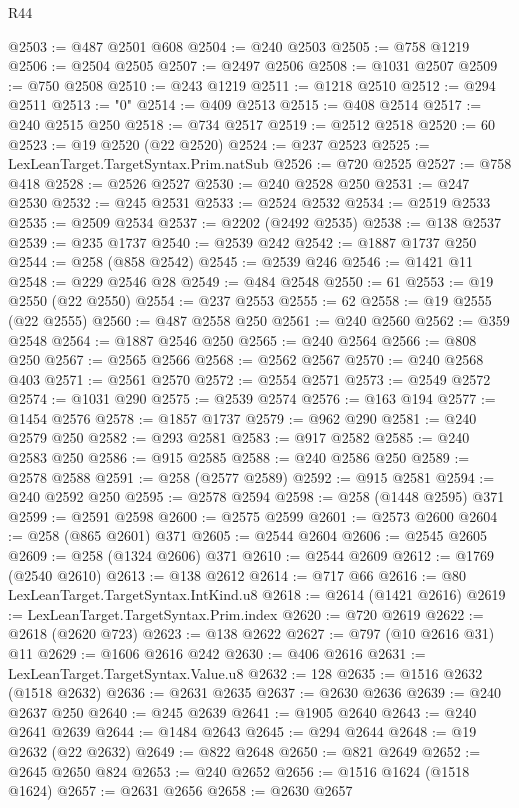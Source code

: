 \begin{lexlean}{R44}
\begin{coremodule}
{@2503 := @487 @2501 @608
@2504 := @240 @2503
@2505 := @758 @1219
@2506 := @2504 @2505
@2507 := @2497 @2506
@2508 := @1031 @2507
@2509 := @750 @2508
@2510 := @243 @1219
@2511 := @1218 @2510
@2512 := @294 @2511
@2513 := "0"
@2514 := @409 @2513
@2515 := @408 @2514
@2517 := @240 @2515 @250
@2518 := @734 @2517
@2519 := @2512 @2518
@2520 := 60
@2523 := @19 @2520 (@22 @2520)
@2524 := @237 @2523
@2525 := LexLeanTarget.TargetSyntax.Prim.natSub
@2526 := @720 @2525
@2527 := @758 @418
@2528 := @2526 @2527
@2530 := @240 @2528 @250
@2531 := @247 @2530
@2532 := @245 @2531
@2533 := @2524 @2532
@2534 := @2519 @2533
@2535 := @2509 @2534
@2537 := @2202 (@2492 @2535)
@2538 := @138 @2537
@2539 := @235 @1737
@2540 := @2539 @242
@2542 := @1887 @1737 @250
@2544 := @258 (@858 @2542)
@2545 := @2539 @246
@2546 := @1421 @11
@2548 := @229 @2546 @28
@2549 := @484 @2548
@2550 := 61
@2553 := @19 @2550 (@22 @2550)
@2554 := @237 @2553
@2555 := 62
@2558 := @19 @2555 (@22 @2555)
@2560 := @487 @2558 @250
@2561 := @240 @2560
@2562 := @359 @2548
@2564 := @1887 @2546 @250
@2565 := @240 @2564
@2566 := @808 @250
@2567 := @2565 @2566
@2568 := @2562 @2567
@2570 := @240 @2568 @403
@2571 := @2561 @2570
@2572 := @2554 @2571
@2573 := @2549 @2572
@2574 := @1031 @290
@2575 := @2539 @2574
@2576 := @163 @194
@2577 := @1454 @2576
@2578 := @1857 @1737
@2579 := @962 @290
@2581 := @240 @2579 @250
@2582 := @293 @2581
@2583 := @917 @2582
@2585 := @240 @2583 @250
@2586 := @915 @2585
@2588 := @240 @2586 @250
@2589 := @2578 @2588
@2591 := @258 (@2577 @2589)
@2592 := @915 @2581
@2594 := @240 @2592 @250
@2595 := @2578 @2594
@2598 := @258 (@1448 @2595) @371
@2599 := @2591 @2598
@2600 := @2575 @2599
@2601 := @2573 @2600
@2604 := @258 (@865 @2601) @371
@2605 := @2544 @2604
@2606 := @2545 @2605
@2609 := @258 (@1324 @2606) @371
@2610 := @2544 @2609
@2612 := @1769 (@2540 @2610)
@2613 := @138 @2612
@2614 := @717 @66
@2616 := @80 LexLeanTarget.TargetSyntax.IntKind.u8
@2618 := @2614 (@1421 @2616)
@2619 := LexLeanTarget.TargetSyntax.Prim.index
@2620 := @720 @2619
@2622 := @2618 (@2620 @723)
@2623 := @138 @2622
@2627 := @797 (@10 @2616 @31) @11
@2629 := @1606 @2616 @242
@2630 := @406 @2616
@2631 := LexLeanTarget.TargetSyntax.Value.u8
@2632 := 128
@2635 := @1516 @2632 (@1518 @2632)
@2636 := @2631 @2635
@2637 := @2630 @2636
@2639 := @240 @2637 @250
@2640 := @245 @2639
@2641 := @1905 @2640
@2643 := @240 @2641 @2639
@2644 := @1484 @2643
@2645 := @294 @2644
@2648 := @19 @2632 (@22 @2632)
@2649 := @822 @2648
@2650 := @821 @2649
@2652 := @2645 @2650 @824
@2653 := @240 @2652
@2656 := @1516 @1624 (@1518 @1624)
@2657 := @2631 @2656
@2658 := @2630 @2657
}
\end{coremodule}
\end{lexlean}
